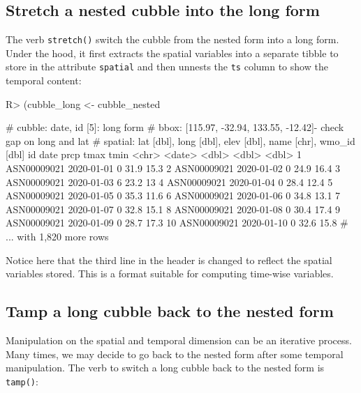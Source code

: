 \documentclass[
]{jss}
\begin{document}
\hypertarget{stretch-a-nested-cubble-into-the-long-form}{%
\subsection{Stretch a nested cubble into the long
form}\label{stretch-a-nested-cubble-into-the-long-form}}

The verb \texttt{stretch()} switch the cubble from the nested form into
a long form. Under the hood, it first extracts the spatial variables
into a separate tibble to store in the attribute \texttt{spatial} and
then unnests the \texttt{ts} column to show the temporal content:

\begin{CodeChunk}
\begin{CodeInput}
R> (cubble_long <- cubble_nested %
\end{CodeInput}
\begin{CodeOutput}
# cubble:  date, id [5]: long form
# bbox:    [115.97, -32.94, 133.55, -12.42]- check gap on long and lat
# spatial: lat [dbl], long [dbl], elev [dbl], name [chr], wmo_id [dbl]
   id          date        prcp  tmax  tmin
   <chr>       <date>     <dbl> <dbl> <dbl>
 1 ASN00009021 2020-01-01     0  31.9  15.3
 2 ASN00009021 2020-01-02     0  24.9  16.4
 3 ASN00009021 2020-01-03     6  23.2  13  
 4 ASN00009021 2020-01-04     0  28.4  12.4
 5 ASN00009021 2020-01-05     0  35.3  11.6
 6 ASN00009021 2020-01-06     0  34.8  13.1
 7 ASN00009021 2020-01-07     0  32.8  15.1
 8 ASN00009021 2020-01-08     0  30.4  17.4
 9 ASN00009021 2020-01-09     0  28.7  17.3
10 ASN00009021 2020-01-10     0  32.6  15.8
# ... with 1,820 more rows
\end{CodeOutput}
\end{CodeChunk}

Notice here that the third line in the header is changed to reflect the
spatial variables stored. This is a format suitable for computing
time-wise variables.

\hypertarget{tamp-a-long-cubble-back-to-the-nested-form}{%
\subsection{Tamp a long cubble back to the nested
form}\label{tamp-a-long-cubble-back-to-the-nested-form}}

Manipulation on the spatial and temporal dimension can be an iterative
process. Many times, we may decide to go back to the nested form after
some temporal manipulation. The verb to switch a long cubble back to the
nested form is \texttt{tamp()}:
\end{document}
